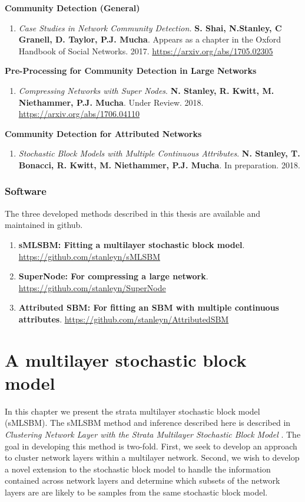 {\bf Community Detection (General)}
\begin{enumerate}
\item \emph{Case Studies in Network Community Detection.} {\bf S. Shai, N.Stanley, C Granell, D. Taylor, P.J. Mucha}. Appears as a chapter in the Oxford Handbook of Social Networks. 2017. \url{https://arxiv.org/abs/1705.02305}
\end{enumerate}

{\bf Pre-Processing for Community Detection in Large Networks}
\begin{enumerate}
\item \emph{Compressing Networks with Super Nodes}. {\bf N. Stanley, R. Kwitt, M. Niethammer, P.J. Mucha}. Under Review. 2018. \url{https://arxiv.org/abs/1706.04110}
\end{enumerate}

 {\bf Community Detection for Attributed Networks}
 \begin{enumerate}
 \item \emph{Stochastic Block Models with Multiple Continuous Attributes}. {\bf N. Stanley, T. Bonacci, R. Kwitt, M. Niethammer, P.J. Mucha}. In preparation. 2018. 
 \end{enumerate}
 
 \subsection{Software}
 The three developed methods described in this thesis are available and maintained in github. 
 
 \begin{enumerate}
 \item {\bf sMLSBM: Fitting a multilayer stochastic block model}. \url{https://github.com/stanleyn/sMLSBM}
 \item {\bf SuperNode: For compressing a large network}. \url{https://github.com/stanleyn/SuperNode}
 \item {\bf Attributed SBM: For fitting an SBM with multiple continuous attributes}. \url{https://github.com/stanleyn/AttributedSBM}
 \end{enumerate}




\chapter{A multilayer stochastic block model}
In this chapter we present the strata multilayer stochastic block model (sMLSBM). The sMLSBM method and inference described here is described in \emph{Clustering Network Layer with the Strata Multilayer Stochastic Block Model} \cite{smlsbm}. The goal in developing this method is two-fold. First, we seek to develop an approach to cluster network layers within a multilayer network. Second, we wish to develop a novel extension to the stochastic block model to handle the information contained across network layers and determine which subsets of the network layers are are likely to be samples from the same stochastic block model. 

